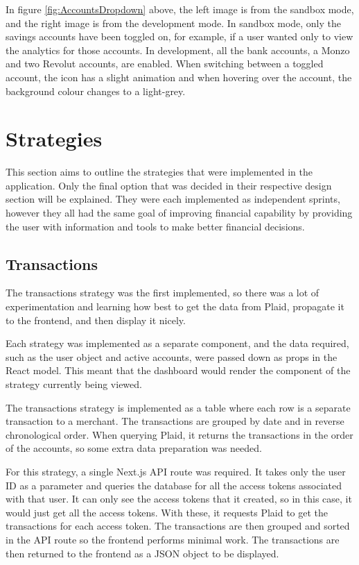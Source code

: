 In figure \ref{fig:AccountsDropdown} above, the left image is from the sandbox mode, and the right image is from the development mode. In sandbox mode, only the savings accounts have been toggled on, for example, if a user wanted only to view the analytics for those accounts. In development, all the bank accounts, a Monzo and two Revolut accounts, are enabled. When switching between a toggled account, the icon has a slight animation and when hovering over the account, the background colour changes to a light-grey.


\section{Strategies}
This section aims to outline the strategies that were implemented in the application. Only the final option that was decided in their respective design section will be explained. They were each implemented as independent sprints, however they all had the same goal of improving financial capability by providing the user with information and tools to make better financial decisions.

\subsection{Transactions}
The transactions strategy was the first implemented, so there was a lot of experimentation and learning how best to get the data from Plaid, propagate it to the frontend, and then display it nicely.

Each strategy was implemented as a separate component, and the data required, such as the user object and active accounts, were passed down as props in the React model. This meant that the dashboard would render the component of the strategy currently being viewed.

The transactions strategy is implemented as a table where each row is a separate transaction to a merchant. The transactions are grouped by date and in reverse chronological order. When querying Plaid, it returns the transactions in the order of the accounts, so some extra data preparation was needed.

For this strategy, a single Next.js API route was required. It takes only the user ID as a parameter and queries the database for all the access tokens associated with that user. It can only see the access tokens that it created, so in this case, it would just get all the access tokens. With these, it requests Plaid to get the transactions for each access token. The transactions are then grouped and sorted in the API route so the frontend performs minimal work. The transactions are then returned to the frontend as a JSON object to be displayed.

